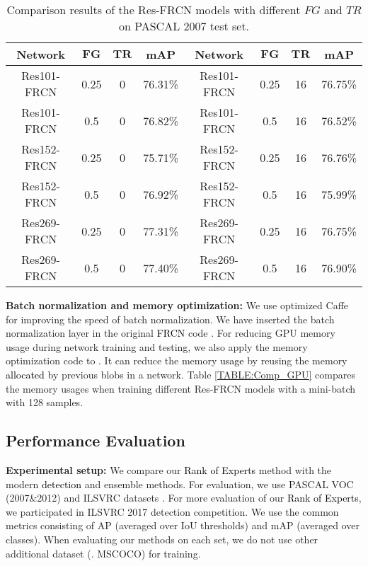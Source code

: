 \documentclass[10pt,twocolumn,letterpaper]{article}
\newcommand{\RE}{\textcolor{black}}
\newcommand{\RV}{\textcolor{black}}
\begin{document}
\begin{table}[tbp]
\vspace{-5pt}
\caption{{Comparison results of the Res-FRCN models with different $FG$ and $TR$ on PASCAL 2007 test set.}}  
\vspace{-0pt}
{\footnotesize
\begin{center}
\renewcommand{\tabcolsep}{0.7mm}
\begin{tabular}{c|c|c|c|c|c|c|c}
\hline \hline
\textbf{Network} & $\mathbf{FG}$ & $\mathbf{TR}$ & \textbf{mAP} & \textbf{Network} & $\mathbf{FG}$ & $\mathbf{TR}$ & \textbf{mAP}  \\
\hline 
Res101-FRCN & 0.25 & 0 & 76.31\% & Res101-FRCN & 0.25 & 16 & 76.75\%\\
Res101-FRCN & 0.5 & 0 & \color{black}76.82\% & Res101-FRCN & 0.5 & 16 & 76.52\%\\
\hline
Res152-FRCN & 0.25 & 0 & 75.71\% & Res152-FRCN & 0.25 & 16 & 76.76\%\\
Res152-FRCN & 0.5 & 0 & \color{black}76.92\% & Res152-FRCN & 0.5 & 16 & 75.99\%\\
\hline
Res269-FRCN & 0.25 & 0 & 77.31\% & Res269-FRCN & 0.25 & 16 & 76.75\%\\
Res269-FRCN & 0.5 & 0 & \color{black}77.40\% & Res269-FRCN & 0.5 & 16 & 76.90\%\\
\hline \hline 
\end{tabular}
\end{center}}
\label{TABLE:Comp_Param}
\vspace{-10pt}
\end{table}

\textbf{Batch normalization and memory optimization:}
We use optimized Caffe \cite{Caffe_TSN2016ECCV} for improving the speed of batch normalization.  We have inserted the batch normalization layer in the original \RE{FRCN} code \cite{RenHGS15_NIPS15}. For reducing GPU memory usage during network training and testing, we also apply the memory optimization code  \cite{Caffe_TSN2016ECCV} to \cite{RenHGS15_NIPS15}. It can reduce the memory \RV{usage} by reusing the memory \RV{allocated} by previous blobs in a network. Table \ref{TABLE:Comp_GPU} compares the memory usages when training different Res-FRCN models with a mini-batch with 128 samples.



\subsection{Performance Evaluation}
%
\textbf{Experimental setup:} We compare our \RV{Rank of Experts} method with the modern \RV{detection} and ensemble methods. For evaluation, we use PASCAL VOC (2007\&2012) \cite{pascalvoc} and ILSVRC datasets \cite{ILSVRC15}. For more evaluation of our \RV{Rank of Experts}, we participated in  ILSVRC 2017 detection competition. We use the common  metrics consisting of AP (averaged over IoU thresholds) and mAP (averaged over classes). When evaluating our methods on each set, we do not use other additional dataset (\eg. MSCOCO) for training. 
\end{document}
